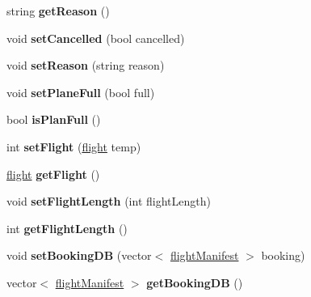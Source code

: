 \begin{DoxyCompactItemize}
\item 
\hypertarget{classschedule_a62a4f0368fb7279a1def845849a9882b}{
string {\bfseries getReason} ()}
\label{classschedule_a62a4f0368fb7279a1def845849a9882b}

\item 
\hypertarget{classschedule_a945ca62360f6ccfc16e9eb7f272122be}{
void {\bfseries setCancelled} (bool cancelled)}
\label{classschedule_a945ca62360f6ccfc16e9eb7f272122be}

\item 
\hypertarget{classschedule_a77abb8a1e0e2133be0b904441d6fd1cc}{
void {\bfseries setReason} (string reason)}
\label{classschedule_a77abb8a1e0e2133be0b904441d6fd1cc}

\item 
\hypertarget{classschedule_a65bae08328fbab1cb6b2563af33ea796}{
void {\bfseries setPlaneFull} (bool full)}
\label{classschedule_a65bae08328fbab1cb6b2563af33ea796}

\item 
\hypertarget{classschedule_a83805ec02548945b269d6893d41c614c}{
bool {\bfseries isPlanFull} ()}
\label{classschedule_a83805ec02548945b269d6893d41c614c}

\item 
\hypertarget{classschedule_a87b22904a4a878fe9c9f543f03263455}{
int {\bfseries setFlight} (\hyperlink{classflight}{flight} temp)}
\label{classschedule_a87b22904a4a878fe9c9f543f03263455}

\item 
\hypertarget{classschedule_a8c865ae254229485909b69d0b2a0be29}{
\hyperlink{classflight}{flight} {\bfseries getFlight} ()}
\label{classschedule_a8c865ae254229485909b69d0b2a0be29}

\item 
\hypertarget{classschedule_a4de86e70a6e4656d1ba33c33e5be6519}{
void {\bfseries setFlightLength} (int flightLength)}
\label{classschedule_a4de86e70a6e4656d1ba33c33e5be6519}

\item 
\hypertarget{classschedule_aa5d8f40511d51bd0c8325efffa3d58ba}{
int {\bfseries getFlightLength} ()}
\label{classschedule_aa5d8f40511d51bd0c8325efffa3d58ba}

\item 
\hypertarget{classschedule_a48e168ec78908aec27acae246c184118}{
void {\bfseries setBookingDB} (vector$<$ \hyperlink{classflight_manifest}{flightManifest} $>$ booking)}
\label{classschedule_a48e168ec78908aec27acae246c184118}

\item 
\hypertarget{classschedule_a5f43a67cfac467570227ded69b566c30}{
vector$<$ \hyperlink{classflight_manifest}{flightManifest} $>$ {\bfseries getBookingDB} ()}
\label{classschedule_a5f43a67cfac467570227ded69b566c30}


\end{DoxyCompactItemize}
